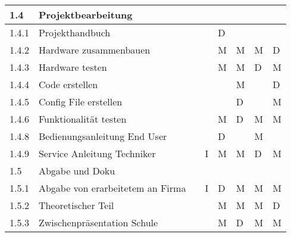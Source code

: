 \begin{longtable}{p{} p{} p{} p{}  p{} p{} p{} p{}}
	\rowcolor{mygray2}1.4 & Projektbearbeitung & & & & & & \\ \midrule
	1.4.1 & Projekthandbuch & & & D & & &  \\
	1.4.2 & Hardware zusammenbauen & & & M & M & M & D \\ \midrule
	1.4.3 & Hardware testen & & & M & M & D & M \\ \midrule
	1.4.4 & Code erstellen & & & & M & & D \\ \midrule
	1.4.5 & Config File erstellen & & & & D & & M \\ \midrule
	1.4.6 & Funktionalität testen & & & M & D & M  & M \\ \midrule
	1.4.8 & Bedienungsanleitung End User & & & D & & M & \\ \midrule
	1.4.9 & Service Anleitung Techniker & & I & M & M & D & M \\ \midrule
	\rowcolor{mygray2}1.5 & Abgabe und Doku & & & & & & \\ \midrule
	1.5.1 & Abgabe von erarbeitetem an Firma & & I & D & M & M & M \\ \midrule
	1.5.2 & Theoretischer Teil & & & M & M & M & D \\ \midrule
	1.5.3 & Zwischenpräsentation Schule & & & M & D & M & M \\ 
\end{longtable}